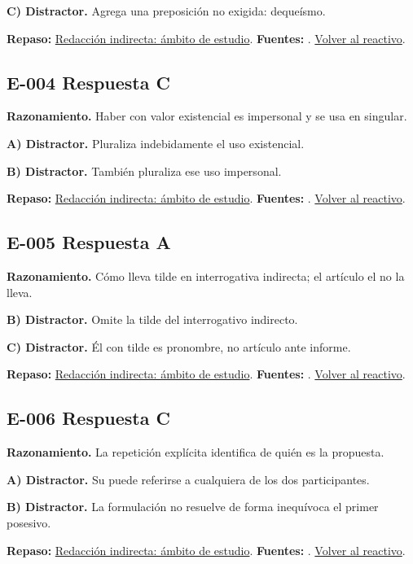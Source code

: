 \textbf{C) Distractor. }Agrega una preposición no exigida: dequeísmo.

\textbf{Repaso:} \hyperref[sec:e1]{Redacción indirecta: ámbito de estudio}. \textbf{Fuentes:} \cite{rae,writing}. \hyperref[q:E-003]{Volver al reactivo}.\par\medskip

\subsection*{E-004 \quad Respuesta C}\label{s:E-004}
\textbf{Razonamiento.} Haber con valor existencial es impersonal y se usa en singular.

\textbf{A) Distractor. }Pluraliza indebidamente el uso existencial.

\textbf{B) Distractor. }También pluraliza ese uso impersonal.

\textbf{Repaso:} \hyperref[sec:e1]{Redacción indirecta: ámbito de estudio}. \textbf{Fuentes:} \cite{rae,writing}. \hyperref[q:E-004]{Volver al reactivo}.\par\medskip

\subsection*{E-005 \quad Respuesta A}\label{s:E-005}
\textbf{Razonamiento.} Cómo lleva tilde en interrogativa indirecta; el artículo el no la lleva.

\textbf{B) Distractor. }Omite la tilde del interrogativo indirecto.

\textbf{C) Distractor. }Él con tilde es pronombre, no artículo ante informe.

\textbf{Repaso:} \hyperref[sec:e1]{Redacción indirecta: ámbito de estudio}. \textbf{Fuentes:} \cite{rae,writing}. \hyperref[q:E-005]{Volver al reactivo}.\par\medskip

\subsection*{E-006 \quad Respuesta C}\label{s:E-006}
\textbf{Razonamiento.} La repetición explícita identifica de quién es la propuesta.

\textbf{A) Distractor. }Su puede referirse a cualquiera de los dos participantes.

\textbf{B) Distractor. }La formulación no resuelve de forma inequívoca el primer posesivo.

\textbf{Repaso:} \hyperref[sec:e1]{Redacción indirecta: ámbito de estudio}. \textbf{Fuentes:} \cite{rae,writing}. \hyperref[q:E-006]{Volver al reactivo}.\par\medskip

